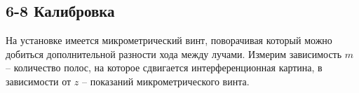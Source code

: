 \documentclass[a4paper,12pt]{article}
\begin{document}
\subsection*{6-8 Калибровка}
На установке имеется микрометрический винт, поворачивая который можно добиться дополнительной разности хода между лучами. Измерим зависимость $m$ -- количество полос, на которое сдвигается интерференционная картина, в зависимости от $z$ -- показаний микрометрического винта.






\end{document}
